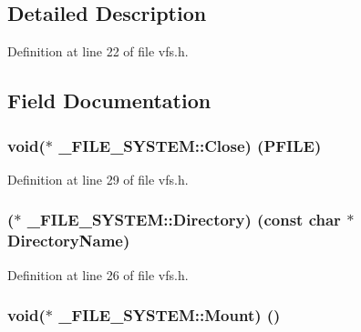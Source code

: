 \subsection{Detailed Description}


Definition at line 22 of file vfs.\+h.



\subsection{Field Documentation}
\subsubsection[{\texorpdfstring{Close}{Close}}]{\setlength{\rightskip}{0pt plus 5cm}void($\ast$ \+\_\+\+F\+I\+L\+E\+\_\+\+S\+Y\+S\+T\+E\+M\+::\+Close) ({\bf P\+F\+I\+LE})}\hypertarget{struct__FILE__SYSTEM_a5595fce92d628028705b1ddd25d21e6f}{}\label{struct__FILE__SYSTEM_a5595fce92d628028705b1ddd25d21e6f}


Definition at line 29 of file vfs.\+h.

\subsubsection[{\texorpdfstring{Directory}{Directory}}]{($\ast$ \+\_\+\+F\+I\+L\+E\+\_\+\+S\+Y\+S\+T\+E\+M\+::\+Directory) (const char $\ast$Directory\+Name)}\hypertarget{struct__FILE__SYSTEM_a96097c4b444cc7c7cd110f8f8c56ed55}{}\label{struct__FILE__SYSTEM_a96097c4b444cc7c7cd110f8f8c56ed55}


Definition at line 26 of file vfs.\+h.

\subsubsection[{\texorpdfstring{Mount}{Mount}}]{\setlength{\rightskip}{0pt plus 5cm}void($\ast$ \+\_\+\+F\+I\+L\+E\+\_\+\+S\+Y\+S\+T\+E\+M\+::\+Mount) ()}\hypertarget{struct__FILE__SYSTEM_a5aa8d15979d91eec1ff97c4701594ff2}{}\label{struct__FILE__SYSTEM_a5aa8d15979d91eec1ff97c4701594ff2}


